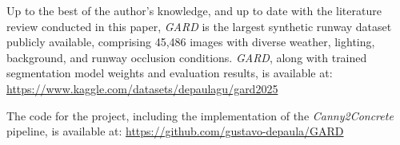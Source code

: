 Up to the best of the author's knowledge, and up to date with the literature review conducted in this paper,
\emph{GARD} is the largest synthetic runway dataset publicly available, comprising 45,486 images with diverse
weather, lighting, background, and runway occlusion conditions. \emph{GARD}, along with trained segmentation model weights and evaluation results, is available at: \url{https://www.kaggle.com/datasets/depaulagu/gard2025}

The code for the project, including the implementation of the \emph{Canny2Concrete} pipeline, is available at: \url{https://github.com/gustavo-depaula/GARD}


\endgroup

